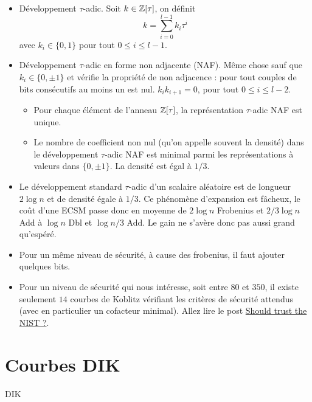 \documentclass[a4paper]{report}
\begin{document}
\begin{itemize}[label=$\bullet$]
    \item Développement $\tau$-adic. Soit $k \in \mathbb{Z}[\tau]$, on définit 
    \begin{equation*}
        k = \sum_{i = 0}^{l-1} k_i \tau^i
    \end{equation*}
    avec $k_i \in \{0, 1 \}$ pour tout $0 \leq i \leq l-1$.
    \item Développement $\tau$-adic en forme non adjacente (NAF). Même chose sauf que $k_i \in \{0, \pm 1\}$ et vérifie la propriété de non adjacence : pour tout couples de bits consécutifs au moins un est nul. $k_i k_{i+1} = 0$, pour tout $0 \leq i \leq l-2$.
    \begin{itemize}[label=--]
        \item Pour chaque élément de l'anneau $\mathbb{Z}[\tau]$, la représentation $\tau$-adic NAF est unique.
        \item Le nombre de coefficient non nul (qu'on appelle souvent la densité) dans le développement $\tau$-adic NAF est minimal parmi les représentations à valeurs dans $\{0, \pm1\}$. La densité est égal à $1/3$.
    \end{itemize}
    
    \item Le développement \og standard \fg{} $\tau$-adic d'un scalaire aléatoire est de longueur $2\log{n}$ et de densité égale à $1/3$. Ce phénomène d'expansion est fâcheux, le coût d'une ECSM passe donc en moyenne de $2\log{n}$ Frobenius et $2/3\log{n}$ Add à $\log{n}$ Dbl et $\log{n}/3$ Add. Le gain ne s'avère donc pas aussi grand qu'espéré. 
    
    \item Pour un même niveau de sécurité, à cause des frobenius, il faut ajouter quelques bits.
    
    \item Pour un niveau de sécurité qui nous intéresse, soit entre $80$ et $350$, il existe seulement $14$ courbes de Koblitz vérifiant les critères de sécurité attendus (avec en particulier un cofacteur minimal). Allez lire le post \href{http://crypto.stackexchange.com/questions/10263/should-we-trust-the-nist-recommended-ecc-parameters}{Should trust the NIST ?}.
\end{itemize}


\section{Courbes DIK}
DIK 

\end{document}
